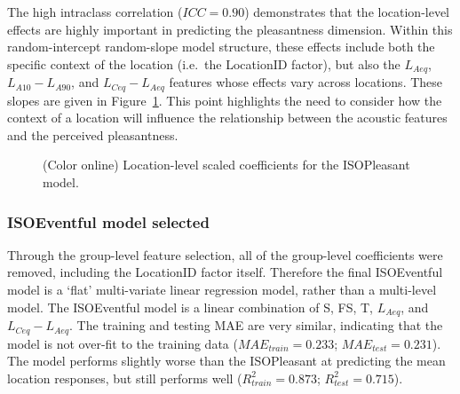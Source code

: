 \documentclass[
  authoryear,
  preprint,
  3p,
  onecolumn]{elsarticle}
\begin{document}
The high intraclass correlation (\(ICC = 0.90\)) demonstrates that the
location-level effects are highly important in predicting the
pleasantness dimension. Within this random-intercept random-slope model
structure, these effects include both the specific context of the
location (i.e.~the LocationID factor), but also the \(L_{Aeq}\),
\(L_{A10}-L_{A90}\), and \(L_{Ceq}-L_{Aeq}\) features whose effects vary
across locations. These slopes are given in Figure~\ref{fig-random}.
This point highlights the need to consider how the context of a location
will influence the relationship between the acoustic features and the
perceived pleasantness.

\begin{figure}


\caption{\label{fig-random}(Color online) Location-level scaled
coefficients for the ISOPleasant model.}

\end{figure}%

\subsubsection{ISOEventful model
selected}\label{isoeventful-model-selected}

Through the group-level feature selection, all of the group-level
coefficients were removed, including the LocationID factor itself.
Therefore the final ISOEventful model is a `flat' multi-variate linear
regression model, rather than a multi-level model. The ISOEventful model
is a linear combination of S, FS, T, \(L_{Aeq}\), and
\(L_{Ceq}-L_{Aeq}\). The training and testing MAE are very similar,
indicating that the model is not over-fit to the training data
(\(MAE_{train} = 0.233\); \(MAE_{test} = 0.231\)). The model performs
slightly worse than the ISOPleasant at predicting the mean location
responses, but still performs well (\(R^2_{train} = 0.873\);
\(R^2_{test} = 0.715\)).
\end{document}
